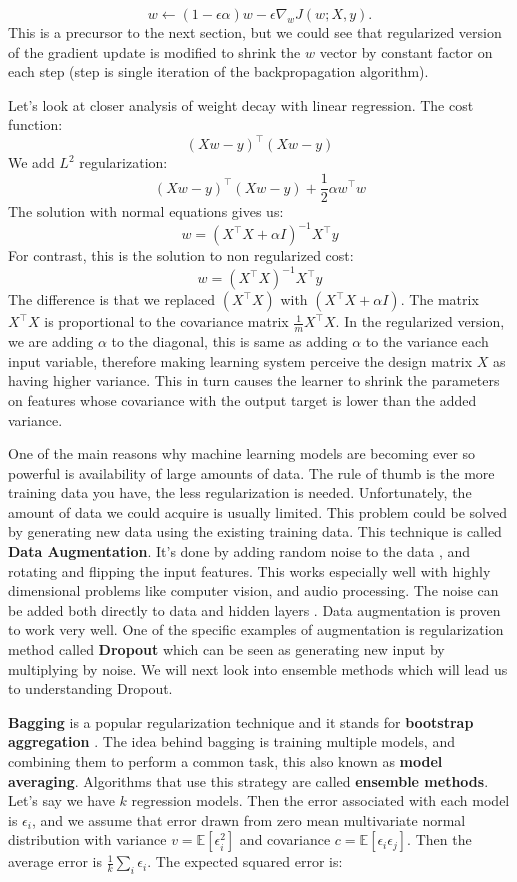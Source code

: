 \documentclass[paper=a4, fontsize=11pt]{scrartcl}
\numberwithin{equation}{section}		%
\numberwithin{figure}{section}			%
\numberwithin{table}{section}			%
\begin{document}
	$$
	w \leftarrow (1-\epsilon\alpha)w - \epsilon \nabla_w J(w;X,y).
	$$
	This is a precursor to the next section, but we could see that regularized version of the gradient update is modified to shrink the $w$ vector by constant factor on each step (step is single iteration of the backpropagation algorithm). 
	\par Let's look at closer analysis of weight decay with linear regression. The cost function:
	$$ 
	(Xw-y)^\top(Xw-y)
	$$
	We add $L^2$ regularization:
	$$
	(Xw-y)^\top(Xw-y) + \frac{1}{2} \alpha w^\top w
	$$
	The solution with normal equations gives us:
	$$
	w = (X^\top X + \alpha I)^{-1}X^\top y
	$$
	For contrast, this is the solution to non regularized cost:
	$$
	w = (X^\top X)^{-1}X^\top y
	$$
	The difference is that we replaced $(X^\top X)$ with $(X^\top X + \alpha I)$. The matrix $X^\top X$ is proportional to the covariance matrix $\frac{1}{m}X^\top X$. In the regularized version, we are adding $\alpha$ to the diagonal, this is same as adding $\alpha$ to the variance each input variable, therefore making learning system perceive the design matrix $X$ as having higher variance. This in turn causes the learner to shrink the parameters on features whose covariance with the output target is lower than the added variance.
	\par
	One of the main reasons why machine learning models are becoming ever so powerful is availability of large amounts of data. The rule of thumb is the more training data you have, the less regularization is needed. Unfortunately, the amount of data we could acquire is usually limited. This problem could be solved by generating new data using the existing training data. This technique is called \textbf{Data Augmentation}. It's done by adding random noise to the data \cite{Sietsma-Dow}, and rotating and flipping the input features. This works especially well with highly dimensional problems like computer vision, and audio processing. The noise can be added both directly to data and hidden layers \cite{autoencoders-Poole}. Data augmentation is proven to work very well. One of the specific examples of augmentation is regularization method called \textbf{Dropout} which can be seen as generating new input by multiplying by noise. We will next look into ensemble methods which will lead us to understanding Dropout.
	\par 
	\textbf{Bagging} is a popular regularization technique and it stands for \textbf{bootstrap aggregation} \cite{Breiman1996}. The idea behind bagging is training multiple models, and combining them to perform a common task, this also known as \textbf{model averaging}. Algorithms that use this strategy are called \textbf{ensemble methods}. Let's say we have $k$ regression models. Then the error associated with each model is $\epsilon_i$, and we assume that error drawn from zero mean multivariate normal distribution with variance $v = \mathbb E[\epsilon_i^2] $ and covariance $c = \mathbb E[\epsilon_i\epsilon_j] $. Then the average error is $\frac{1}{k}\sum_i \epsilon_i$. The expected squared error is:
\end{document}
